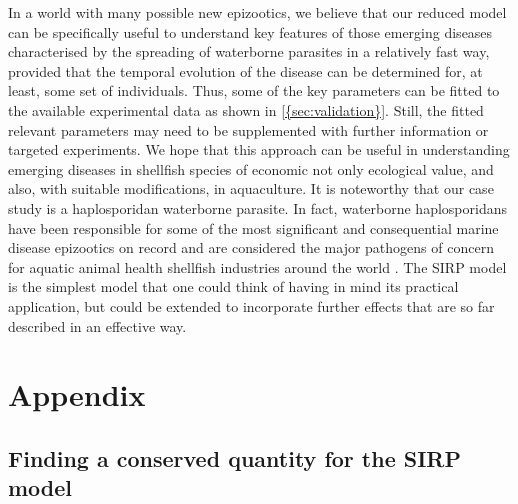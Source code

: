 In a world with many possible new epizootics, we believe that our reduced model
can be specifically useful to understand key features of those emerging
diseases characterised by the spreading of waterborne parasites in a relatively
fast way, provided that the temporal evolution of the disease can be determined
for, at least, some set of individuals. Thus, some of the key parameters can be
fitted to the available experimental data as shown in \cref{{sec:validation}}.
Still, the fitted relevant parameters may need to be supplemented with further
information or targeted experiments. We hope that this approach can be useful
in understanding emerging diseases in shellfish species of economic not only
ecological value, and also, with suitable modifications, in aquaculture. It is
noteworthy that our case study is a haplosporidan waterborne parasite.	In
fact, waterborne haplosporidans have been responsible for some of the most
significant and consequential marine disease epizootics on record and are
considered the major pathogens of concern for aquatic animal health shellfish
industries around the world \cite{Arzul2015}. The SIRP model is the simplest
model that one could think of having in mind its practical application, but
could be extended to incorporate further effects that are so far described in
an effective way.

\section{Appendix} \label{sec:appendix_nacras}

\subsection{Finding a conserved quantity for the SIRP model}
\label{app:P_exact}

